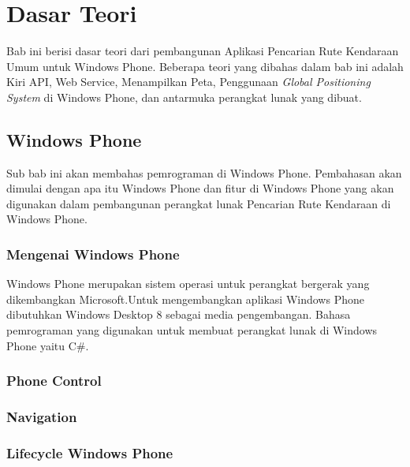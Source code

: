 \chapter{Dasar Teori}
\label{chap:teori}
Bab ini berisi dasar teori dari pembangunan Aplikasi Pencarian Rute Kendaraan Umum untuk Windows Phone. Beberapa teori yang dibahas dalam bab ini  adalah Kiri API, Web Service, Menampilkan Peta, Penggunaan \textit{Global Positioning System} di Windows Phone, dan antarmuka perangkat lunak yang dibuat. 

\section{Windows Phone}
\label{sec:Windows Phone}
\hspace{0.5cm} Sub bab ini akan membahas pemrograman di Windows Phone. Pembahasan akan dimulai dengan apa itu Windows Phone dan fitur di Windows Phone yang akan digunakan dalam pembangunan perangkat lunak Pencarian Rute Kendaraan di Windows Phone. 

\subsection{Mengenai Windows Phone}
\label{subsec:Mengenai Windows Phone}
\hspace{0.5cm} Windows Phone merupakan sistem operasi untuk perangkat bergerak yang dikembangkan Microsoft.\footnotemark[1] Untuk mengembangkan aplikasi Windows Phone dibutuhkan Windows Desktop 8 sebagai media pengembangan. Bahasa pemrograman yang digunakan untuk membuat perangkat lunak di Windows Phone yaitu C\#.  

\subsection{Phone Control}
\label{subsec:Phone Control}

\subsection{Navigation}
\label{subsec:Navigation}

\subsection{Lifecycle Windows Phone}
\label{subsec:Lifecycle Windows Phone}

